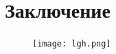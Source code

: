 \documentclass[a4paper,12pt]{article} %
\begin{document}
\section{Заключение}

\begin{figure}[h!]
\begin{floatrow}
 \ffigbox[\FBwidth]{\caption{}\label{fig:Graph_5}}%
         {\texttt{[image: lgh.png]}}     
\end{floatrow}
\end{figure}
\end{document}
